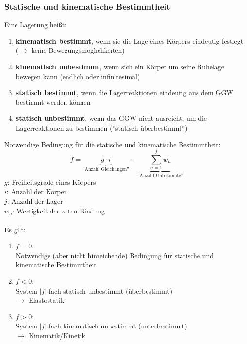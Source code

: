 \documentclass[a4paper,twocolumn,10pt]{article}
\begin{document}
\subsubsection{Statische und kinematische Bestimmtheit}
Eine Lagerung heißt:
\begin{enumerate}[label=$\bullet$]
\item \textbf{kinematisch bestimmt}, wenn sie die Lage eines Körpers eindeutig festlegt\\ ($\rightarrow$ keine Bewegungsmöglichkeiten)
\item \textbf{kinematisch unbestimmt}, wenn sich ein Körper um seine Ruhelage bewegen kann (endlich oder infinitesimal)
\item \textbf{statisch bestimmt}, wenn die Lagerreaktionen eindeutig aus dem GGW bestimmt werden können
\item \textbf{statisch unbestimmt}, wenn das GGW nicht ausreicht, um die Lagerreaktionen zu bestimmen (''statisch überbestimmt'')
\end{enumerate}
Notwendige Bedingung für die statische und kinematische Bestimmtheit:
\begin{equation*}
f=\underbrace{g\cdot i}_{\text{''Anzahl Gleichungen''}}-\underbrace{\sum\limits_{n=1}^{j}w_n}_{\text{''Anzahl Unbekannte''}}
\end{equation*}
$g$: Freiheitsgrade eines Körpers\\
$i$: Anzahl der Körper\\
$j$: Anzahl der Lager\\
$w_n$: Wertigkeit der $n$-ten Bindung\\\\
Es gilt:
\begin{enumerate}[label=$\bullet$]
\item $f=0$:\\
Notwendige (aber nicht hinreichende) Bedingung für statische und kinematische Bestimmtheit
\item $f<0$:\\
System $|f|$-fach statisch unbestimmt (überbestimmt)\\
$\rightarrow$ Elastostatik
\item $f>0$:\\
System $|f|$-fach kinematisch unbestimmt (unterbestimmt)\\
$\rightarrow$ Kinematik/Kinetik
\end{enumerate}
\end{document}
